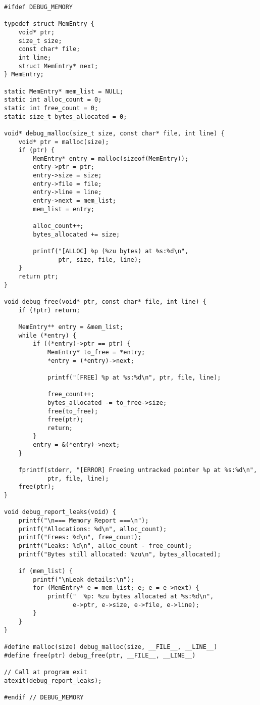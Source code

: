 \begin{lstlisting}
#ifdef DEBUG_MEMORY

typedef struct MemEntry {
    void* ptr;
    size_t size;
    const char* file;
    int line;
    struct MemEntry* next;
} MemEntry;

static MemEntry* mem_list = NULL;
static int alloc_count = 0;
static int free_count = 0;
static size_t bytes_allocated = 0;

void* debug_malloc(size_t size, const char* file, int line) {
    void* ptr = malloc(size);
    if (ptr) {
        MemEntry* entry = malloc(sizeof(MemEntry));
        entry->ptr = ptr;
        entry->size = size;
        entry->file = file;
        entry->line = line;
        entry->next = mem_list;
        mem_list = entry;

        alloc_count++;
        bytes_allocated += size;

        printf("[ALLOC] %p (%zu bytes) at %s:%d\n",
               ptr, size, file, line);
    }
    return ptr;
}

void debug_free(void* ptr, const char* file, int line) {
    if (!ptr) return;

    MemEntry** entry = &mem_list;
    while (*entry) {
        if ((*entry)->ptr == ptr) {
            MemEntry* to_free = *entry;
            *entry = (*entry)->next;

            printf("[FREE] %p at %s:%d\n", ptr, file, line);

            free_count++;
            bytes_allocated -= to_free->size;
            free(to_free);
            free(ptr);
            return;
        }
        entry = &(*entry)->next;
    }

    fprintf(stderr, "[ERROR] Freeing untracked pointer %p at %s:%d\n",
            ptr, file, line);
    free(ptr);
}

void debug_report_leaks(void) {
    printf("\n=== Memory Report ===\n");
    printf("Allocations: %d\n", alloc_count);
    printf("Frees: %d\n", free_count);
    printf("Leaks: %d\n", alloc_count - free_count);
    printf("Bytes still allocated: %zu\n", bytes_allocated);

    if (mem_list) {
        printf("\nLeak details:\n");
        for (MemEntry* e = mem_list; e; e = e->next) {
            printf("  %p: %zu bytes allocated at %s:%d\n",
                   e->ptr, e->size, e->file, e->line);
        }
    }
}

#define malloc(size) debug_malloc(size, __FILE__, __LINE__)
#define free(ptr) debug_free(ptr, __FILE__, __LINE__)

// Call at program exit
atexit(debug_report_leaks);

#endif // DEBUG_MEMORY
\end{lstlisting}

